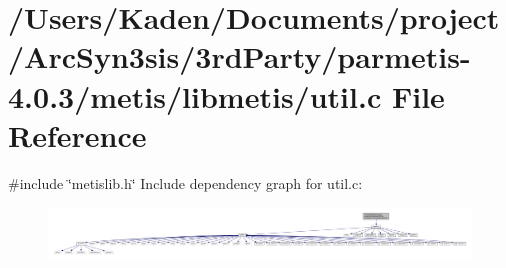 \hypertarget{a00870}{}\section{/\+Users/\+Kaden/\+Documents/project/\+Arc\+Syn3sis/3rd\+Party/parmetis-\/4.0.3/metis/libmetis/util.c File Reference}
\label{a00870}
{\ttfamily \#include \char`\"{}metislib.\+h\char`\"{}}\newline
Include dependency graph for util.\+c\+:\nopagebreak
\begin{figure}[H]
\begin{center}
\leavevmode
\includegraphics[width=350pt]{a00871}
\end{center}
\end{figure}
